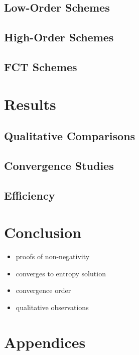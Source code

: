 \documentclass{report}
\begin{document}
\section{Low-Order Schemes}
\section{High-Order Schemes}
\section{FCT Schemes}

\chapter{Results}
\section{Qualitative Comparisons}
\section{Convergence Studies}
\section{Efficiency}

\chapter{Conclusion}
\begin{itemize}
  \item proofs of non-negativity
  \item converges to entropy solution
  \item convergence order
  \item qualitative observations
\end{itemize}

\chapter{Appendices}
\end{document}
